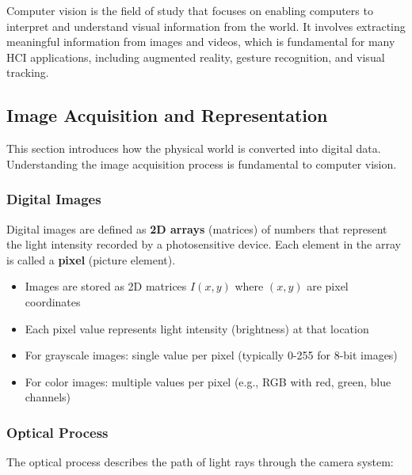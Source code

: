 \documentclass[11pt,a4paper]{article}
\theoremstyle{definition}
\theoremstyle{plain}
\theoremstyle{remark}
\begin{document}
Computer vision is the field of study that focuses on enabling computers to interpret and understand visual information from the world. It involves extracting meaningful information from images and videos, which is fundamental for many HCI applications, including augmented reality, gesture recognition, and visual tracking.

\subsection{Image Acquisition and Representation}

This section introduces how the physical world is converted into digital data. Understanding the image acquisition process is fundamental to computer vision.

\subsubsection{Digital Images}

Digital images are defined as \textbf{2D arrays} (matrices) of numbers that represent the light intensity recorded by a photosensitive device. Each element in the array is called a \textbf{pixel} (picture element).

\begin{tcolorbox}[colback=blue!5!white,colframe=blue!75!black,title=\textbf{Digital Image Representation}]
\begin{itemize}
    \item Images are stored as 2D matrices $I(x, y)$ where $(x, y)$ are pixel coordinates
    \item Each pixel value represents light intensity (brightness) at that location
    \item For grayscale images: single value per pixel (typically 0-255 for 8-bit images)
    \item For color images: multiple values per pixel (e.g., RGB with red, green, blue channels)
\end{itemize}
\end{tcolorbox}

\subsubsection{Optical Process}

The optical process describes the path of light rays through the camera system:
\end{document}
